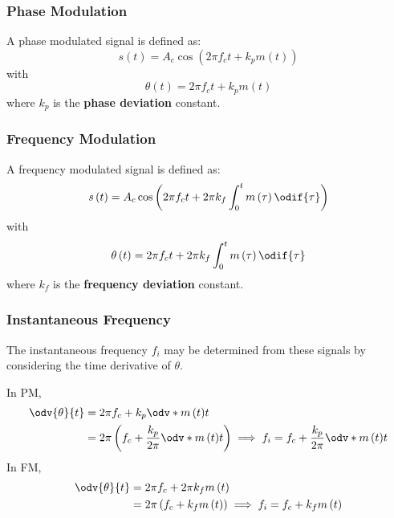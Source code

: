 \documentclass{article}
\begin{document}
\subsubsection{Phase Modulation}
A phase modulated signal is defined as:
\begin{equation*}
    s\left( t \right) = A_c \cos{\left( 2\pi f_c t + k_p m\left( t \right) \right)}
\end{equation*}
with
\begin{equation*}
    \theta\left( t \right) = 2\pi f_c t + k_p m\left( t \right)
\end{equation*}
where \(k_p\) is the \textbf{phase deviation} constant.
\subsubsection{Frequency Modulation}
A frequency modulated signal is defined as:
\begin{equation*}
    s\left( t \right) = A_c \cos{\left( 2\pi f_c t + 2\pi k_f \int_0^t m\left( \tau \right) \odif{\tau} \right)}
\end{equation*}
with
\begin{equation*}
    \theta\left( t \right) = 2\pi f_c t + 2\pi k_f \int_0^t m\left( \tau \right) \odif{\tau}
\end{equation*}
where \(k_f\) is the \textbf{frequency deviation} constant.
\subsubsection{Instantaneous Frequency}
The instantaneous frequency \(f_i\) may be determined from these
signals by considering the time derivative of \(\theta\).

In PM,
\begin{align*}
    \odv{\theta}{t} & = 2\pi f_c + k_p \odv*{m\left( t \right)}{t}                                                                                               \\
                    & = 2\pi \left( f_c + \frac{k_p}{2\pi} \odv*{m\left( t \right)}{t} \right) \implies f_i = f_c + \frac{k_p}{2\pi} \odv*{m\left( t \right)}{t}
\end{align*}
In FM,
\begin{align*}
    \odv{\theta}{t} & = 2\pi f_c + 2\pi k_f m\left( t \right)                                                      \\
                    & = 2\pi \left( f_c + k_f m\left( t \right) \right) \implies f_i = f_c + k_f m\left( t \right)
\end{align*}
\end{document}
